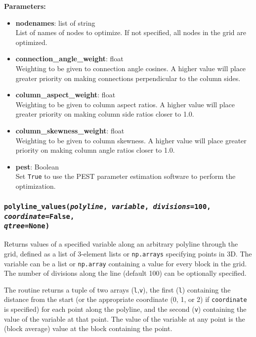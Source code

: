 \textbf{Parameters:}
\begin{itemize}
\item \textbf{nodenames}: list of string\\
  List of names of nodes to optimize.  If not specified, all nodes in the grid are optimized.
\item \textbf{connection\_angle\_weight}: float\\
  Weighting to be given to connection angle cosines.  A higher value will place greater priority on making connections perpendicular to the column sides.
\item \textbf{column\_aspect\_weight}: float\\
  Weighting to be given to column aspect ratios.  A higher value will place greater priority on making column side ratios closer to 1.0.
\item \textbf{column\_skewness\_weight}: float\\
  Weighting to be given to column skewness.  A higher value will place greater priority on making column angle ratios closer to 1.0.
\item \textbf{pest}: Boolean\\
  Set \texttt{True} to use the PEST parameter estimation software to perform the optimization.
\end{itemize}

\begin{snugshade}\subsubsection{\texttt{polyline\_values(\emph{polyline}, \emph{variable}, \emph{divisions}=100, \emph{coordinate}=\texttt{False},\\
      \emph{qtree}=None)}}\end{snugshade}
\label{sec:mulgrid:polyline_values}

Returns values of a specified variable along an arbitrary polyline through the grid, defined as a list of 3-element lists or \texttt{np.arrays} specifying points in 3D.  The variable can be a list or \texttt{np.array} containing a value for every block in the grid.  The number of divisions along the line (default 100) can be optionally specified.

The routine returns a tuple of two arrays (\texttt{l},\texttt{v}), the first (\texttt{l}) containing the distance from the start (or the appropriate coordinate (0, 1, or 2) if \texttt{coordinate} is specified) for each point along the polyline, and the second (\texttt{v}) containing the value of the variable at that point.  The value of the variable at any point is the (block average) value at the block containing the point.

